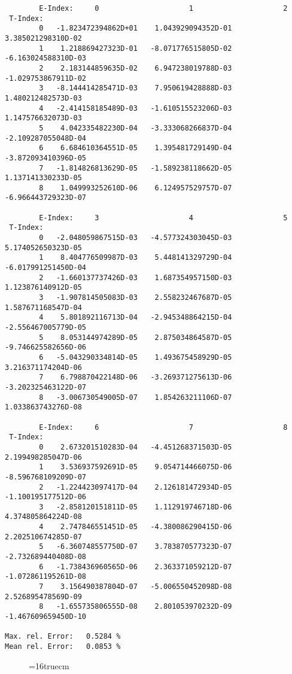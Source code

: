 \documentclass[12pt]{article}
\begin{document}
\begin{small}\begin{verbatim}
        E-Index:     0                     1                     2
 T-Index:
        0   -1.823472394862D+01    1.043929094352D-01    3.385021298310D-02
        1    1.218869427323D-01   -8.071776515805D-02   -6.163024588310D-03
        2    2.183144859635D-02    6.947238019788D-03   -1.029753867911D-02
        3   -8.144414285471D-03    7.950619428888D-03    1.480212482573D-03
        4   -2.414158185489D-03   -1.610515523206D-03    1.147576632073D-03
        5    4.042335482230D-04   -3.333068266837D-04   -2.109287055048D-04
        6    6.684610364551D-05    1.395481729149D-04   -3.872093410396D-05
        7   -1.814826813629D-05   -1.589238118662D-05    1.137141330233D-05
        8    1.049993252610D-06    6.124957529757D-07   -6.966443729323D-07

        E-Index:     3                     4                     5
 T-Index:
        0   -2.048059867515D-03   -4.577324303045D-03    5.174052650323D-05
        1    8.404776509987D-03    5.448141329729D-04   -6.017991251450D-04
        2   -1.660137737426D-03    1.687354957150D-03    1.123876140912D-05
        3   -1.907814505083D-03    2.558232467687D-05    1.587671168547D-04
        4    5.801892116713D-04   -2.945348864215D-04   -2.556467005779D-05
        5    8.053144974289D-05    2.875034864587D-05   -9.746625582656D-06
        6   -5.043290334814D-05    1.493675458929D-05    3.216371174204D-06
        7    6.798870422148D-06   -3.269371275613D-06   -3.202325463122D-07
        8   -3.006730549005D-07    1.854263211106D-07    1.033863743276D-08

        E-Index:     6                     7                     8
 T-Index:
        0    2.673201510283D-04   -4.451268371503D-05    2.199498285047D-06
        1    3.536937592691D-05    9.054714466075D-06   -8.596768109209D-07
        2   -1.224423097417D-04    2.126181472934D-05   -1.100195177512D-06
        3   -2.858120151811D-05    1.112919746718D-06    4.374805864224D-08
        4    2.747846551451D-05   -4.380086290415D-06    2.202510674285D-07
        5   -6.360748557750D-07    3.783870577323D-07   -2.732689440408D-08
        6   -1.738436960565D-06    2.363371059212D-07   -1.072861195261D-08
        7    3.156490387804D-07   -5.006550452098D-08    2.526895478569D-09
        8   -1.655735806555D-08    2.801053970232D-09   -1.467609659450D-10

Max. rel. Error:   0.5284 %
Mean rel. Error:   0.0853 %
\end{verbatim}\end{small}
\begin{figure} \label{0.1T}
\epsfxsize=16truecm
\end{figure}
\newpage
\end{document}
